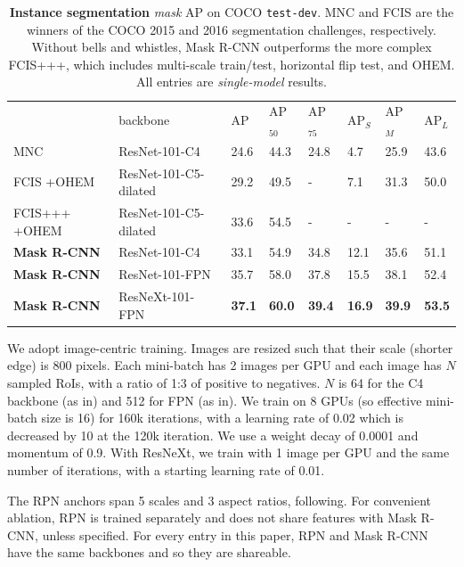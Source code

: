 \begin{table}[t]
\begin{tabular}{l|l|x{22}x{22}x{22}|x{22}x{22}x{22}}
  & backbone &  AP &  AP$_{50}$ & AP$_{75}$ & AP$_S$ &  AP$_M$ &  AP$_L$\\
\shline
  MNC  & ResNet-101-C4
  & 24.6 & 44.3 & 24.8 & 4.7 & 25.9 & 43.6\\
  FCIS  +OHEM & ResNet-101-C5-dilated
  & 29.2 & 49.5 & - & 7.1 & 31.3 & 50.0\\
  FCIS+++  +OHEM & ResNet-101-C5-dilated
  & 33.6 & 54.5 & - & - & - & -\\
\hline
  \textbf{Mask R-CNN} & ResNet-101-C4
  & 33.1 & 54.9 & 34.8 & 12.1 & 35.6 & 51.1 \\
  \textbf{Mask R-CNN} & ResNet-101-FPN
  & 35.7 & 58.0 & 37.8 & 15.5 & 38.1 & 52.4\\
  \textbf{Mask R-CNN} & ResNeXt-101-FPN
  & \textbf{37.1} & \textbf{60.0} & \textbf{39.4} & \textbf{16.9} & \textbf{39.9} & \textbf{53.5}
\end{tabular}
\caption{\textbf{Instance segmentation} \emph{mask} AP on COCO \texttt{test-dev}. MNC and FCIS are the winners of the COCO 2015 and 2016 segmentation challenges, respectively. Without bells and whistles, Mask R-CNN outperforms the more complex FCIS+++, which includes multi-scale train/test, horizontal flip test, and OHEM. All entries are \emph{single-model} results.}
\label{tab:final_mask}
\end{table}

We adopt image-centric training. Images are resized such that their scale (shorter edge) is 800 pixels. Each mini-batch has 2 images per GPU and each image has $N$ sampled RoIs, with a ratio of 1:3 of positive to negatives. $N$ is 64 for the C4 backbone (as in) and 512 for FPN (as in).  We train on 8 GPUs (so effective mini-batch size is 16) for 160k iterations, with a learning rate of 0.02 which is decreased by 10 at the 120k iteration. We use a weight decay of 0.0001 and momentum of 0.9. With ResNeXt, we train with 1 image per GPU and the same number of iterations, with a starting learning rate of 0.01.

The RPN anchors span 5 scales and 3 aspect ratios, following. For convenient ablation, RPN is trained separately and does not share features with Mask R-CNN, unless specified. For every entry in this paper, RPN and Mask R-CNN have the same backbones and so they are shareable.

